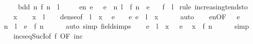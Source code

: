 \begin{isabellebody}
\ \ \ \ \ bdd{\isacharcolon}{\kern0pt}\ {\isachardoublequoteopen}{\isasymAnd}n{\isachardot}{\kern0pt}\ f\ n\ {\isasymle}\ l{\isachardoublequoteclose}\isanewline
\ \ \ \ \ en{\isacharcolon}{\kern0pt}\ {\isachardoublequoteopen}{\isasymAnd}e{\isachardot}{\kern0pt}\ {}\ {\isacharless}{\kern0pt}\ e\ {\isasymLongrightarrow}\ {\isasymexists}n{\isachardot}{\kern0pt}\ l\ {\isasymle}\ f\ n\ {\isacharplus}{\kern0pt}\ e{\isachardoublequoteclose}\isanewline
\ \ \ {\isachardoublequoteopen}f\ {\isasymlonglonglongrightarrow}\ l{\isachardoublequoteclose}\isanewline
%
\isadelimproof
%
\endisadelimproof
%
\isatagproof
{}\isamarkupfalse%
\ {\isacharparenleft}{\kern0pt}rule\ increasing{\isacharunderscore}{\kern0pt}tendsto{\isacharparenright}{\kern0pt}\isanewline
\ \ \isamarkupfalse%
\ x\isanewline
\ \ \isamarkupfalse%
\ {\isachardoublequoteopen}x\ {\isacharless}{\kern0pt}\ l{\isachardoublequoteclose}\isanewline
\ \ \isamarkupfalse%
\ dense{\isacharbrackleft}{\kern0pt}of\ {}\ {\isachardoublequoteopen}l\ {\isacharminus}{\kern0pt}\ x{\isachardoublequoteclose}{\isacharbrackright}{\kern0pt}\ \isamarkupfalse%
\ e\ \ {\isachardoublequoteopen}{}\ {\isacharless}{\kern0pt}\ e{\isachardoublequoteclose}\ {\isachardoublequoteopen}e\ {\isacharless}{\kern0pt}\ l\ {\isacharminus}{\kern0pt}\ x{\isachardoublequoteclose}\isanewline
\ \ \ \ \isamarkupfalse%
\ auto\isanewline
\ \ \isamarkupfalse%
\ en{\isacharbrackleft}{\kern0pt}OF\ {\isacartoucheopen}{}\ {\isacharless}{\kern0pt}\ e{\isacartoucheclose}{\isacharbrackright}{\kern0pt}\ \isamarkupfalse%
\ n\ \ {\isachardoublequoteopen}l\ {\isacharminus}{\kern0pt}\ e\ {\isasymle}\ f\ n{\isachardoublequoteclose}\isanewline
\ \ \ \ \isamarkupfalse%
\ {\isacharparenleft}{\kern0pt}auto\ simp{\isacharcolon}{\kern0pt}\ field{\isacharunderscore}{\kern0pt}simps{\isacharparenright}{\kern0pt}\isanewline
\ \ \isamarkupfalse%
\ {\isacartoucheopen}e\ {\isacharless}{\kern0pt}\ l\ {\isacharminus}{\kern0pt}\ x{\isacartoucheclose}\ {\isacartoucheopen}{}\ {\isacharless}{\kern0pt}\ e{\isacartoucheclose}\ \isamarkupfalse%
\ {\isachardoublequoteopen}x\ {\isacharless}{\kern0pt}\ f\ n{\isachardoublequoteclose}\isanewline
\ \ \ \ \isamarkupfalse%
\ simp\isanewline
\ \ \isamarkupfalse%
\ incseq{\isacharunderscore}{\kern0pt}SucI{\isacharbrackleft}{\kern0pt}of\ f{\isacharcomma}{\kern0pt}\ OF\ inc{\isacharbrackright}{\kern0pt}\ \isamarkupfalse%

\end{isabellebody}
